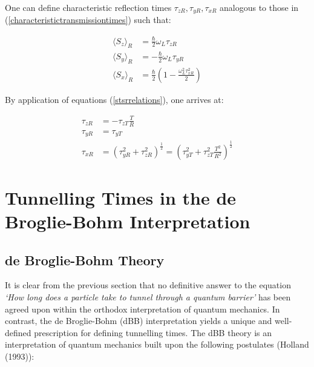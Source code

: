 \documentclass{article}
\begin{document}
\noindent One can define characteristic reflection times $\tau_{zR}, \tau_{yR}, \tau_{xR}$ analogous to those in (\ref{characteristictransmissiontimes}) such that:

\begin{subequations}
\begin{align}
	\langle S_z \rangle_R &= \frac{\hbar}{2}\omega_L\tau_{zR} \\
	\langle S_y \rangle_R &= -\frac{\hbar}{2}\omega_L\tau_{yR} \\
	\langle S_x \rangle_R &= \frac{\hbar}{2}\left(1-\frac{\omega_L^2\tau_{xR}^2}{2}\right)
\end{align}
\end{subequations}

\noindent By application of equations (\ref{stsrrelations}), one arrives at:

\begin{subequations}
\begin{align}
	\tau_{zR}&=-\tau_{zT} \frac{T}{R}\\
	\tau_{yR}&=\tau_{yT}\\
\tau_{xR}&=(\tau_{yR}^2+\tau_{zR}^2)^{\frac{1}{2}}=\left(\tau_{yT}^2+\tau_{zT}^2 \frac{T^2}{R^2}\right)^{\frac{1}{2}}
\end{align}
\end{subequations}

\pagebreak
\section{Tunnelling Times in the de Broglie-Bohm Interpretation}
\label{section:dBB}
\subsection{de Broglie-Bohm Theory}
\label{subsection:dBBtheory}
\noindent It is clear from the previous section that no definitive answer to the equation \textit{`How long does a particle take to tunnel through a quantum barrier'} has been agreed upon within the orthodox interpretation of quantum mechanics. In contrast, the de Broglie-Bohm (dBB) interpretation yields a unique and well-defined prescription for defining tunnelling times. The dBB theory is an interpretation of quantum mechanics built upon the following postulates (Holland (1993)):
\end{document}
